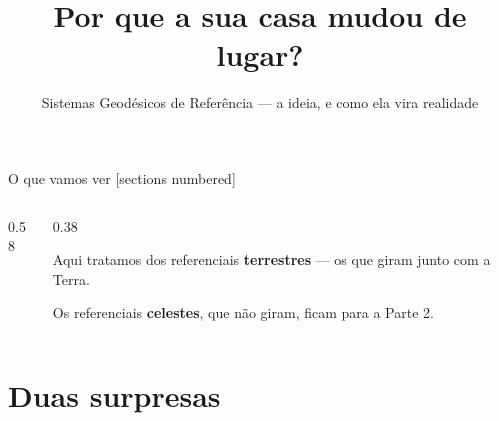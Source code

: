 \documentclass[aspectratio=169,11pt]{beamer}
\title{Por que a sua casa mudou de lugar?}
\subtitle{Sistemas Geodésicos de Referência --- a ideia, e como ela vira realidade}
\author{}
\institute{Simulador de Sistemas de Coordenadas}
\date{}
\begin{document}
\maketitle

\begin{frame}{O que vamos ver}
  [sections numbered]
  \begin{columns}[T]
    \begin{column}{0.58\textwidth}
      \tableofcontents
    \end{column}
    \begin{column}{0.38\textwidth}
      \begin{ideia}[title={Esta é a Parte 1}]
        \small Aqui tratamos dos referenciais \textbf{terrestres} --- os que giram junto com
        a Terra.
        \medskip

        Os referenciais \textbf{celestes}, que não giram, ficam para a Parte 2.
      \end{ideia}
    \end{column}
  \end{columns}
\end{frame}

\section{Duas surpresas}
\end{document}
